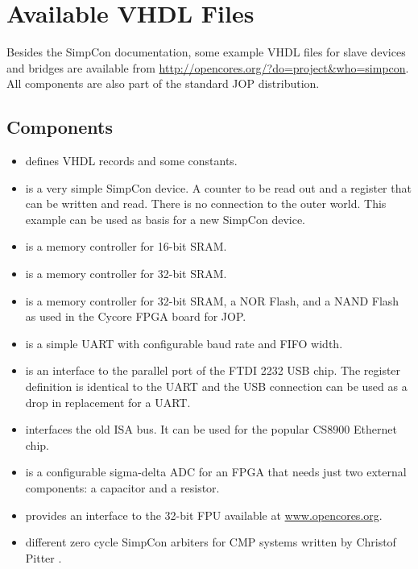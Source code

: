 \section{Available VHDL Files}

Besides the SimpCon documentation, some example VHDL files for slave
devices and bridges are available from
\url{http://opencores.org/?do=project&who=simpcon}. All components
are also part of the standard JOP distribution.


\subsection{Components}

\begin{itemize}
    \item {} defines VHDL records and some
    constants.
    \item {} is a very simple SimpCon
        device. A counter to be read out and a register that can
        be written and read. There is no connection to the outer
        world. This example can be used as basis for a new
        SimpCon device.
    \item {} is a memory controller for 16-bit
    SRAM.
    \item {} is a memory controller for 32-bit
    SRAM.
    \item {} is a memory controller for 32-bit
    SRAM, a NOR Flash, and a NAND Flash as used in the Cycore FPGA board for JOP.
    \item {} is a simple UART with configurable
    baud rate and FIFO width.
    \item {} is an interface to the parallel port of
    the FTDI 2232 USB chip. The register definition is identical to
    the UART and the USB connection can be used as a drop in
    replacement for a UART.
    \item {} interfaces the old ISA bus. It can be used
    for the popular CS8900 Ethernet chip.
    \item {} is a configurable sigma-delta ADC
        for an FPGA that needs just two external components: a
        capacitor and a resistor.
    \item {} provides an interface to the 32-bit FPU available
    at \url{www.opencores.org}.
    \item {} different zero cycle SimpCon
        arbiters for CMP systems written by Christof Pitter
        \cite{jop:cmp}.
\end{itemize}

